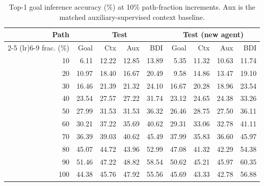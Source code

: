\begin{table}[H]
  \centering
  \scriptsize
  \setlength{\tabcolsep}{2.2pt}
  \renewcommand{\arraystretch}{1.08}
  \caption{Top-1 goal inference accuracy (\%) at 10\% path-fraction increments. Aux is the matched auxiliary-supervised context baseline.}
  \label{tab:goal_inference_top1_tenths}
  \begin{tabular}{r*{8}{r}}
    \toprule
    Path & \multicolumn{4}{c}{Test} & \multicolumn{4}{c}{Test (new agent)} \\
    \cmidrule(lr){2-5} \cmidrule(lr){6-9}
    frac. (\%) & Goal & Ctx & Aux & BDI & Goal & Ctx & Aux & BDI \\
    \midrule
     10 & 6.11 & 12.22 & 12.85 & 13.89 & 5.35 & 11.32 & 10.63 & 11.74 \\
     20 & 10.97 & 18.40 & 16.67 & 20.49 & 9.58 & 14.86 & 13.47 & 19.10 \\
     30 & 16.46 & 21.39 & 21.32 & 24.10 & 16.67 & 20.28 & 18.96 & 23.54 \\
     40 & 23.54 & 27.57 & 27.22 & 31.74 & 23.12 & 24.65 & 24.38 & 33.26 \\
     50 & 27.99 & 31.53 & 31.53 & 36.32 & 26.46 & 28.75 & 27.50 & 36.11 \\
     60 & 30.21 & 37.22 & 35.69 & 40.62 & 29.31 & 33.06 & 32.78 & 41.11 \\
     70 & 36.39 & 39.03 & 40.62 & 45.49 & 37.99 & 35.83 & 36.60 & 45.97 \\
     80 & 45.07 & 44.72 & 43.96 & 52.99 & 47.08 & 41.32 & 42.29 & 54.38 \\
     90 & 51.46 & 47.22 & 48.82 & 58.54 & 50.62 & 45.21 & 45.97 & 60.35 \\
    100 & 44.38 & 45.76 & 47.92 & 55.56 & 45.69 & 43.33 & 42.78 & 56.88 \\
    \bottomrule
  \end{tabular}
\end{table}
